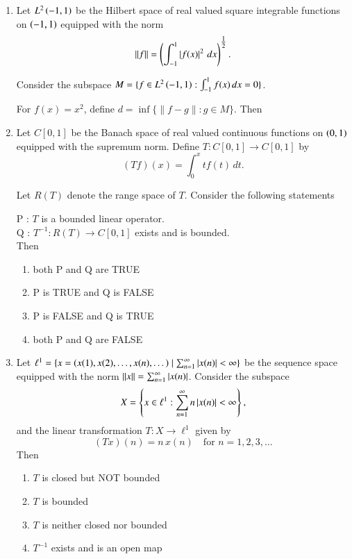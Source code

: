 \documentclass[journal,12pt,onecolumn]{IEEEtran}
\theoremstyle{remark}
\begin{document}
\begin{enumerate}[start=1, label=Q.\arabic*]
\hfill{}


\item Let $L^{2}\left(-1,1\right)$ be the Hilbert space of real valued square integrable functions on $\left(-1,1\right)$ equipped with the norm 
\[
\lVert f \rVert=\left(\int_{-1}^{1}\left\vert f(x)\right\vert^{2}\,dx\right)^{\tfrac{1}{2}}.
\]

Consider the subspace $M=\{f \in L^{2}\left(-1,1\right) : \int_{-1}^{1}f(x)\,dx=0\}$.  

For $f(x)=x^{2}$, define $d=\inf\{\lVert f-g \rVert : g \in M\}$. Then
\begin{enumerate}
\end{enumerate}

\hfill{}
\item Let $C[0,1]$ be the Banach space of real valued continuous functions on $\left(0,1\right)$ equipped with the supremum norm.  
Define $T : C[0,1]\to C[0,1]$ by
\[
(Tf)(x)=\int_{0}^{x}t f(t)\,dt.
\]

Let $R(T)$ denote the range space of $T$. Consider the following statements\brak{:}

P : $T$ is a bounded linear operator.\\
Q : $T^{-1} : R(T)\to C[0,1]$ exists and is bounded.\\

Then
\begin{enumerate}
\item both P and Q are TRUE
\item P is TRUE and Q is FALSE
\item P is FALSE and Q is TRUE
\item both P and Q are FALSE
\end{enumerate}

\hfill{}


\item Let $\ell^{1}=\{x=\left(x(1),x(2),\dots,x(n),\dots\right) \mid \sum_{n=1}^{\infty}\left\vert x(n)\right\vert<\infty\}$ be the sequence space equipped with the norm $\lVert x \rVert=\sum_{n=1}^{\infty}\left\vert x(n)\right\vert$.  
Consider the subspace
\[
X=\left\{x \in \ell^{1} : \sum_{n=1}^{\infty}n\left\vert x(n)\right\vert<\infty\right\},
\]
and the linear transformation $T : X\to \ell^{1}$ given by
\[
(Tx)(n)=n\,x(n)\quad \text{for } n=1,2,3,\dots
\]
Then
\begin{enumerate}
\item $T$ is closed but NOT bounded
\item $T$ is bounded
\item $T$ is neither closed nor bounded
\item $T^{-1}$ exists and is an open map
\end{enumerate}


\end{enumerate}
\end{document}
